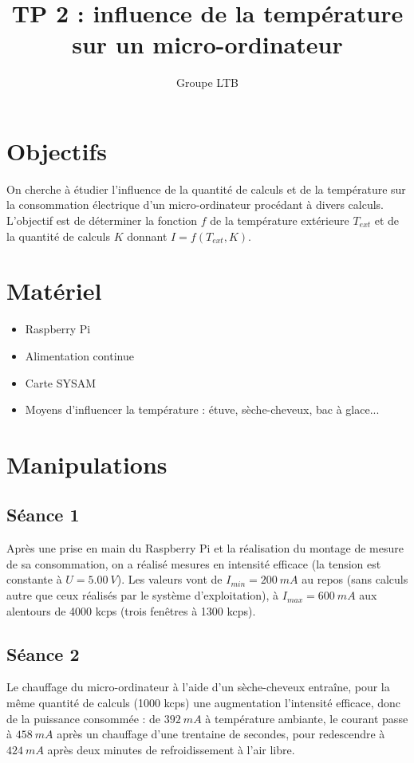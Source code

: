 \documentclass[french]{article}
\title{TP 2 : influence de la température\\
sur un micro-ordinateur}
\author{Groupe LTB}
\begin{document}
\maketitle

\section{Objectifs}

On cherche à étudier l'influence de la quantité de calculs et de la température sur la consommation électrique d'un micro-ordinateur procédant à divers calculs. L'objectif est de déterminer la fonction $f$ de la température extérieure $T_{ext}$ et de la quantité de calculs $K$ donnant $I = f(T_{ext}, K)$.

\section{Matériel}

\begin{itemize}
    \item Raspberry Pi
    \item Alimentation continue
    \item Carte SYSAM
    \item Moyens d'influencer la température : étuve, sèche-cheveux, bac à glace...
\end{itemize}

\section{Manipulations}

\subsection{Séance 1}

Après une prise en main du Raspberry Pi et la réalisation du montage de mesure de sa consommation, on a réalisé mesures en intensité efficace (la tension est constante à $U = \SI{5,00}{V}$). Les valeurs vont de $I_{min} = \SI{200}{mA}$ au repos (sans calculs autre que ceux réalisés par le système d'exploitation), à $I_{max} = \SI{600}{mA}$ aux alentours de 4000 kcps (trois fenêtres à 1300 kcps).

\subsection{Séance 2}

Le chauffage du micro-ordinateur à l'aide d'un sèche-cheveux entraîne, pour la même quantité de calculs (1000 kcps) une augmentation l'intensité efficace, donc de la puissance consommée : de $\SI{392}{mA}$ à température ambiante, le courant passe à $\SI{458}{mA}$ après un chauffage d'une trentaine de secondes, pour redescendre à $\SI{424}{mA}$ après deux minutes de refroidissement à l'air libre.
\end{document}
